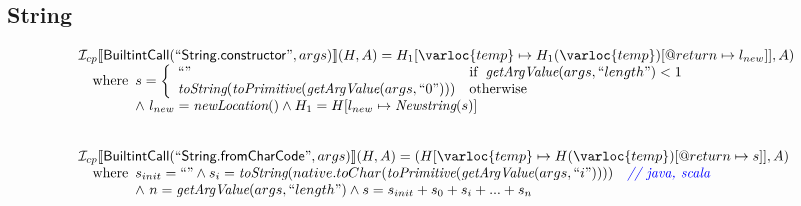 \subsection{String}
\[
\begin{array}{l}
\I _{cp}\lbr \SF{BuiltintCall}(``\SF{String.constructor}",args)\rbr(H,A)
 = H_1[\varloc{temp}\mapsto H_1(\varloc{temp})[\varprop{return}\mapsto l_{new}]], A) \\
\quad\wherec{
  s = \left\{\begin{array}{ll}
      ``" & \ifc{\hf{getArgValue}(args,``length") < 1}\\
      \hf{toString}(\hf{toPrimitive}(\hf{getArgValue}(args,``0"))) & \owc
    \end{array}\right.\\
  \land\ l_{new} = \hf{newLocation}()\land H_1 = H[l_{new} \mapsto \hf{Newstring}(s)]
  }\\
\\\\


\I _{cp}\lbr \SF{BuiltintCall}(``\SF{String.fromCharCode}",args)\rbr(H,A)
 = (H[\varloc{temp}\mapsto H(\varloc{temp})[\varprop{return}\mapsto s]], A) \\
\quad\wherec{
  s_{init} = ``" \land s_i = \hf{toString}(native.toChar(\hf{toPrimitive}(\hf{getArgValue}(args,``i"))))
  \quad\comment{{\inblue // java, scala}}\\
  \land\ n = \hf{getArgValue}(args, ``length") \land s = s_{init} + s_0 + s_i + ... + s_n
  }\\
\end{array}
\]

